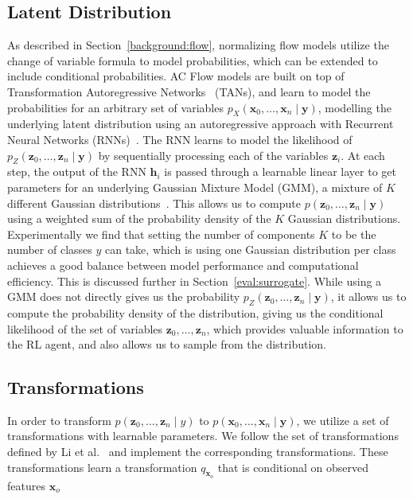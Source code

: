 \documentclass[../main.tex]{subfiles}
\begin{document}
\subsection{Latent Distribution}

As described in Section~\ref{background:flow}, 
normalizing flow models utilize the change of variable formula to model probabilities,
which can be extended to include conditional probabilities. AC Flow models are built on top of
Transformation Autoregressive
Networks~\cite{tans} (TANs), and learn to model 
the probabilities for an arbitrary set of variables $p_X(\mathbf{x}_0,\ldots, \mathbf{x}_n \mid \mathbf{y})$,
modelling the underlying latent distribution using an autoregressive approach with Recurrent
Neural Networks (RNNs)~\cite{rnn}. The RNN learns to model the likelihood of 
$p_Z(\mathbf{z}_0, \ldots, \mathbf{z}_n \mid \mathbf{y})$ by sequentially processing each of the variables $\mathbf{z}_i$.
At each step, the output of the RNN $\mathbf{h}_i$ is 
passed through a learnable linear layer to get parameters for an underlying Gaussian Mixture Model (GMM),
a mixture of $K$ different Gaussian distributions~\cite{gmm}.
This allows us to compute $p(\mathbf{z}_0, \ldots, \mathbf{z}_n \mid \mathbf{y})$ 
using a weighted
sum of the probability density of the $K$ Gaussian distributions. Experimentally
we find that setting the number of components $K$ to be the number of classes 
$y$ can take, which is using one Gaussian distribution per class 
achieves
a good balance between model performance and computational efficiency.
This is discussed further in Section~\ref{eval:surrogate}.
While using a GMM does not directly gives us the probability
$p_Z(\mathbf{z}_0, \ldots, \mathbf{z}_n \mid \mathbf{y})$, it allows us to compute the probability density of the distribution, giving 
us the conditional likelihood of the set of variables $\mathbf{z}_0, \ldots, \mathbf{z}_n$, which provides valuable information
to the RL agent, and also allows us to sample from the distribution.

\subsection{Transformations}

In order to transform $p(\mathbf{z}_0, \ldots, \mathbf{z}_n \mid y)$ to $p(\mathbf{x}_0,\ldots, \mathbf{x}_n \mid \mathbf{y})$, we
utilize a set of transformations with learnable parameters. We follow the 
set of transformations defined by Li et al.~\cite{acflow} and implement the corresponding
transformations. These transformations learn a transformation $q_{\mathbf{x}_o}$ that is conditional on 
observed features $\mathbf{x}_o$
\end{document}
